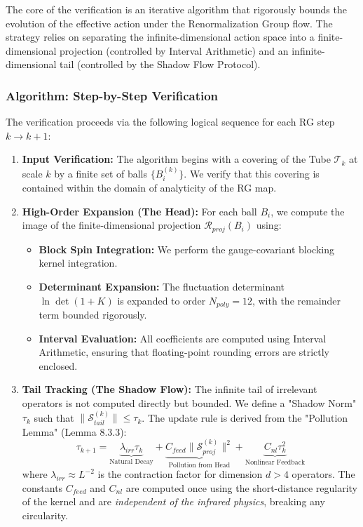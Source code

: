 The core of the verification is an iterative algorithm that rigorously bounds the evolution of the effective action under the Renormalization Group flow. The strategy relies on separating the infinite-dimensional action space into a finite-dimensional projection (controlled by Interval Arithmetic) and an infinite-dimensional tail (controlled by the Shadow Flow Protocol).

\subsubsection{Algorithm: Step-by-Step Verification}

The verification proceeds via the following logical sequence for each RG step $k \to k+1$:

\begin{enumerate}
    \item \textbf{Input Verification:} The algorithm begins with a covering of the Tube $\mathcal{T}_k$ at scale $k$ by a finite set of balls $\{B_i^{(k)}\}$. We verify that this covering is contained within the domain of analyticity of the RG map.

    \item \textbf{High-Order Expansion (The Head):} For each ball $B_i$, we compute the image of the finite-dimensional projection $\mathcal{R}_{proj}(B_i)$ using:
    \begin{itemize}
        \item \textbf{Block Spin Integration:} We perform the gauge-covariant blocking kernel integration.
        \item \textbf{Determinant Expansion:} The fluctuation determinant $\ln \det(1 + K)$ is expanded to order $N_{poly}=12$, with the remainder term bounded rigorously.
        \item \textbf{Interval Evaluation:} All coefficients are computed using Interval Arithmetic, ensuring that floating-point rounding errors are strictly enclosed.
    \end{itemize}

    \item \textbf{Tail Tracking (The Shadow Flow):} The infinite tail of irrelevant operators is not computed directly but bounded. We define a "Shadow Norm" $\tau_k$ such that $\| \mathcal{S}_{tail}^{(k)} \| \le \tau_k$. The update rule is derived from the "Pollution Lemma" (Lemma 8.3.3):
    \[
    \tau_{k+1} = \underbrace{\lambda_{irr} \tau_k}_{\text{Natural Decay}} + \underbrace{C_{feed} \| \mathcal{S}_{proj}^{(k)} \|^2}_{\text{Pollution from Head}} + \underbrace{C_{nl} \tau_k^2}_{\text{Nonlinear Feedback}}
    \]
    where $\lambda_{irr} \approx L^{-2}$ is the contraction factor for dimension $d>4$ operators. The constants $C_{feed}$ and $C_{nl}$ are computed once using the short-distance regularity of the kernel and are \emph{independent of the infrared physics}, breaking any circularity.


\end{enumerate}
